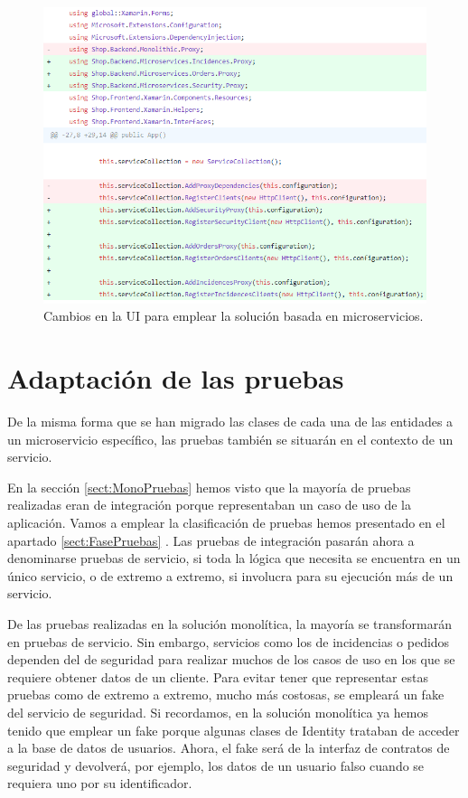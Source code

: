 \documentclass[11pt,spanish,listoffigures]{tfgetsinf}
\begin{document}
\begin{figure}[h]
\centering
\includegraphics[scale=0.9]{ChangesUI}
\caption{Cambios en la UI para emplear la solución basada en microservicios.}
\label{fig:ChangesUI}
\end{figure}


\section{Adaptación de las pruebas}

De la misma forma que se han migrado las clases de cada una de las entidades a un microservicio específico, las pruebas también se situarán en el contexto de un servicio.

En la sección \ref{sect:MonoPruebas}  hemos visto que la mayoría de pruebas realizadas eran de integración porque representaban un caso de uso de la aplicación. Vamos a emplear la clasificación de pruebas hemos presentado en el apartado \ref{sect:FasePruebas} . Las pruebas de integración pasarán ahora a denominarse pruebas de servicio, si toda la lógica que necesita se encuentra en un único servicio, o de extremo a extremo, si involucra para su ejecución más de un servicio.

De las pruebas realizadas en la solución monolítica, la mayoría se transformarán en pruebas de servicio. Sin embargo, servicios como los de incidencias o pedidos dependen del de seguridad para realizar muchos de los casos de uso en los que se requiere obtener datos de un cliente. Para evitar tener que representar estas pruebas como de extremo a extremo, mucho más costosas, se empleará un fake del servicio de seguridad. Si recordamos, en la solución monolítica ya hemos tenido que emplear un fake porque algunas clases de Identity trataban de acceder a la base de datos de usuarios. Ahora, el fake será de la interfaz de contratos de seguridad y devolverá, por ejemplo, los datos de un usuario falso cuando se requiera uno por su identificador.
\end{document}
